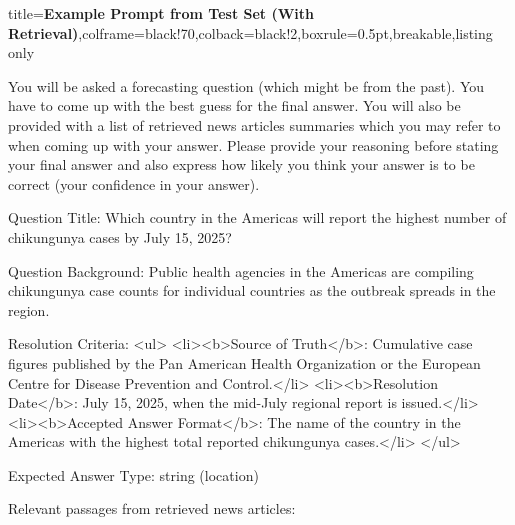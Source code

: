 \documentclass{article} %
\begin{document}
\begin{tcblisting}{title={\textbf{Example Prompt from Test Set (With Retrieval)}},colframe=black!70,colback=black!2,boxrule=0.5pt,breakable,listing only}

You will be asked a forecasting question (which might be from the past).
You have to come up with the best guess for the final answer.
You will also be provided with a list of retrieved news articles summaries which you may refer to when coming up with your answer.
Please provide your reasoning before stating your final answer and also express how likely you think your answer is to be correct (your confidence in your answer).

Question Title:
Which country in the Americas will report the highest number of chikungunya cases by July 15, 2025?

Question Background:
Public health agencies in the Americas are compiling chikungunya case counts for individual countries as the outbreak spreads in the region.

Resolution Criteria:
<ul>
  <li><b>Source of Truth</b>: Cumulative case figures published by the Pan American Health Organization or the European Centre for Disease Prevention and Control.</li>
  <li><b>Resolution Date</b>: July 15, 2025, when the mid-July regional report is issued.</li>
  <li><b>Accepted Answer Format</b>: The name of the country in the Americas with the highest total reported chikungunya cases.</li>
</ul>

Expected Answer Type:
string (location)

Relevant passages from retrieved news articles:


\end{tcblisting}
\end{document}
